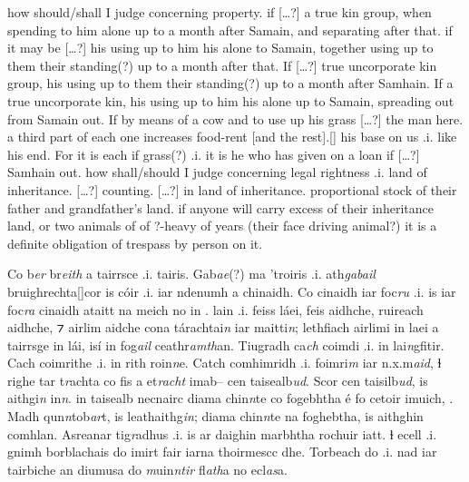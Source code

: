 \documentclass[11pt]{article}
\begin{document}
\begin{pages}
\begin{Rightside}
    \pstart
    how should/shall I judge concerning property. if [\ldots?] a true kin group, when spending to him alone up to a month after Samain, and separating after that. if it may be [\ldots?] his using up to him his alone to Samain, together using up to them their standing(?) up to a month after that.  If [\ldots?] true uncorporate kin group, his using up to them their standing(?) up to a month after Samhain.  If a true uncorporate kin, his using up to him his alone up to Samain, spreading out from Samain out.  If by means of a cow and to use up his grass [\ldots?] the man here.  a third part of each one increases food-rent [and the rest].[\hspace{2mm}] his base on us .i. like his end. For it is each if grass(?) .i. it is he who has given on a loan if [\ldots?] Samhain out.  how shall/should I judge concerning legal rightness .i. land of inheritance.  [\ldots?] counting.  [\ldots?] in land of inheritance.  proportional stock of their father and grandfather's land. if anyone will carry excess of their inheritance land, or two animals of of ?-heavy of years (their face driving animal?) it is a definite obligation of trespass by person on it. 

    \pend
  \endnumbering
  \end{Rightside}

  \Pages
 
  \begin{Leftside}
    \beginnumbering
    \pstart
    Co b\emph{er} br\emph{eith} a tairrsce .i.  tairis.  Gab\emph{ae}(?) ma 'troiris .i. ath\emph{gabail} bruighrechta[\hspace{2mm}]cor is c\'{o}ir .i. iar ndenumh a chinaidh.  Co cinaidh iar foc\emph{ru} .i. is iar foc\emph{ra} cinaidh ataitt na meich no in .   lain .i. feiss l\'{a}ei, feis aidhche, ruireach aidhche, ⁊ airlim aidche cona t\'{a}rachtai\emph{n} iar maitti\emph{n}; lethfiach airlimi in laei a tairrsge in l\'{a}i, is\'{i} in fog\emph{ail} ceathr\emph{amth}an.  Tiugradh  ca\emph{ch} coimdi .i. in lai\emph{n}gfitir.  Cach coimrithe .i. in rith roin\emph{n}e.  Catch comhimridh .i. foimri\emph{m} iar n.x.m\emph{aid}, ɫ righe tar t\emph{r}achta co fis a et\emph{racht} imab-- cen taisealb\emph{ud}.  Scor cen taisilb\emph{ud}, is aithgi\emph{n} in\emph{n}.  in taisealb necnairc diama chin\emph{n}te co fogebhtha \'{e} fo cetoir imuich, .  Madh qun\emph{n}tob\emph{ar}t, is leathaithg\emph{in}; diama chin\emph{n}te na foghebtha, is aithghin comhlan.  Asreanar tig\emph{r}adhus .i. is ar daighin marbhtha rochuir iatt. ɫ ecell .i. gnimh borblachais do imirt fair iarna thoirmescc dhe. Torbeach do  .i. nad iar tairbiche an diumusa do \emph{m}uin\emph{ntir} fl\emph{ath}a no ecl\emph{as}a. 
        \pend
  \endnumbering
  \end{Leftside}


\end{pages}
\end{document}
